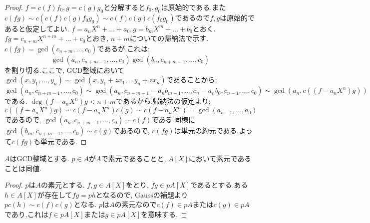 \begin{proof}
	$f=c(f)f_0,g=c(g)g_0$と分解すると$f_0,g_0$は原始的である.また$c(fg)\sim c(c(f)c(g)f_0g_0)\sim c(f)c(g)c(f_0g_0)$であるので$f,g$は原始的であると仮定してよい. $f=a_nX^n+\dots+a_0,g=b_mX^m+\dots+b_0$とおく. $fg=c_{n+m}X^{n+m}+\dots+c_0$とおき, $n+m$についての帰納法で示す. $c(fg)=\gcd(c_{n+m},\dots,c_0)$であるが,これは;
	\[\gcd(a_n,c_{n+m-1},\dots, c_0)\gcd(b_n,c_{n+m-1},\dots,c_0)\]
	を割り切る.ここで, GCD整域において$\gcd(x,y_1,\dots,y_n)\sim\gcd(x,y_1+zx_1,\dots y_n+zx_n)$であることから;
	\[\gcd(a_n,c_{n+m-1},\dots,c_0)\sim\gcd(a_n,c_{n+m-1}-a_nb_{m-1},\dots,c_n-a_nb_0,c_{n-1},\dots,c_0)\sim\gcd(a_n, c((f-a_nX^n)g))\]
	である. $\deg(f-a_nX^n)g<n+m$であるから,帰納法の仮定より;
	\[c((f-a_nX^n)g)\sim c(f-a_nX^n)c(g)\sim c(f-a_nX^n)=\gcd(a_{n-1},\dots,a_0)\]
	であるので, $\gcd(a_n,c_{n+m-1},\dots,c_0)\sim c(f)$である.同様に$\gcd(b_m,c_{n+m-1},\dots,c_0)\sim c(g)$であるので, $c(fg)$は単元の約元である.よって$c(fg)$も単元である.
\end{proof}

%

\begin{prop}
	$A$はGCD整域とする. $p\in A$が$A$で素元であることと, $A[X]$において素元であることは同値.
\end{prop}

\begin{proof}
	$p$は$A$の素元とする. $f,g\in A[X]$をとり, $fg\in pA[X]$であるとする.ある$h\in A[X]$が存在して$fg=ph$となるので, Gaussの補題より$pc(h)\sim c(f)c(g)$となる. $p$は$A$の素元なので$c(f)\in pA$または$c(g)\in pA$であり,これは$f\in pA[X]$または$g\in pA[X]$を意味する.
\end{proof}

